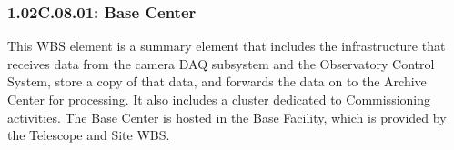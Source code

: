 \subsubsection*{1.02C.08.01: Base Center}

This WBS element is a summary element that includes the infrastructure that
receives data from the camera DAQ subsystem and the Observatory Control
System, store a copy of that data, and forwards the data on to the Archive
Center for processing. It also includes a cluster dedicated to Commissioning
activities. The Base Center is hosted in the Base Facility, which is provided
by the Telescope and Site WBS.
